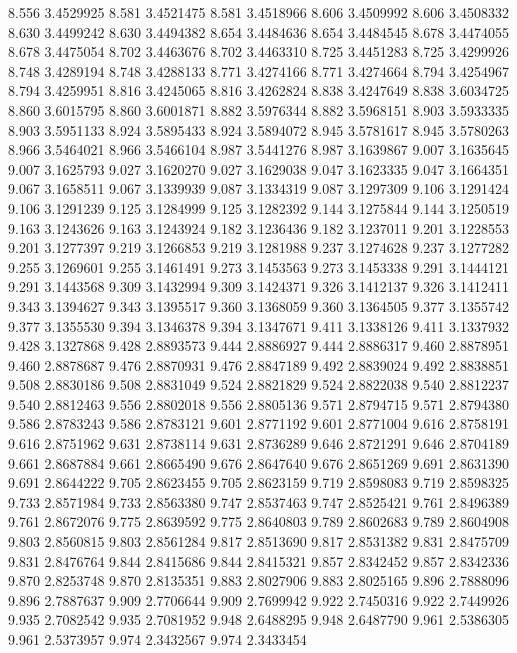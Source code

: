 8.556 3.4529925
8.581 3.4521475
8.581 3.4518966
8.606 3.4509992
8.606 3.4508332
8.630 3.4499242
8.630 3.4494382
8.654 3.4484636
8.654 3.4484545
8.678 3.4474055
8.678 3.4475054
8.702 3.4463676
8.702 3.4463310
8.725 3.4451283
8.725 3.4299926
8.748 3.4289194
8.748 3.4288133
8.771 3.4274166
8.771 3.4274664
8.794 3.4254967
8.794 3.4259951
8.816 3.4245065
8.816 3.4262824
8.838 3.4247649
8.838 3.6034725
8.860 3.6015795
8.860 3.6001871
8.882 3.5976344
8.882 3.5968151
8.903 3.5933335
8.903 3.5951133
8.924 3.5895433
8.924 3.5894072
8.945 3.5781617
8.945 3.5780263
8.966 3.5464021
8.966 3.5466104
8.987 3.5441276
8.987 3.1639867
9.007 3.1635645
9.007 3.1625793
9.027 3.1620270
9.027 3.1629038
9.047 3.1623335
9.047 3.1664351
9.067 3.1658511
9.067 3.1339939
9.087 3.1334319
9.087 3.1297309
9.106 3.1291424
9.106 3.1291239
9.125 3.1284999
9.125 3.1282392
9.144 3.1275844
9.144 3.1250519
9.163 3.1243626
9.163 3.1243924
9.182 3.1236436
9.182 3.1237011
9.201 3.1228553
9.201 3.1277397
9.219 3.1266853
9.219 3.1281988
9.237 3.1274628
9.237 3.1277282
9.255 3.1269601
9.255 3.1461491
9.273 3.1453563
9.273 3.1453338
9.291 3.1444121
9.291 3.1443568
9.309 3.1432994
9.309 3.1424371
9.326 3.1412137
9.326 3.1412411
9.343 3.1394627
9.343 3.1395517
9.360 3.1368059
9.360 3.1364505
9.377 3.1355742
9.377 3.1355530
9.394 3.1346378
9.394 3.1347671
9.411 3.1338126
9.411 3.1337932
9.428 3.1327868
9.428 2.8893573
9.444 2.8886927
9.444 2.8886317
9.460 2.8878951
9.460 2.8878687
9.476 2.8870931
9.476 2.8847189
9.492 2.8839024
9.492 2.8838851
9.508 2.8830186
9.508 2.8831049
9.524 2.8821829
9.524 2.8822038
9.540 2.8812237
9.540 2.8812463
9.556 2.8802018
9.556 2.8805136
9.571 2.8794715
9.571 2.8794380
9.586 2.8783243
9.586 2.8783121
9.601 2.8771192
9.601 2.8771004
9.616 2.8758191
9.616 2.8751962
9.631 2.8738114
9.631 2.8736289
9.646 2.8721291
9.646 2.8704189
9.661 2.8687884
9.661 2.8665490
9.676 2.8647640
9.676 2.8651269
9.691 2.8631390
9.691 2.8644222
9.705 2.8623455
9.705 2.8623159
9.719 2.8598083
9.719 2.8598325
9.733 2.8571984
9.733 2.8563380
9.747 2.8537463
9.747 2.8525421
9.761 2.8496389
9.761 2.8672076
9.775 2.8639592
9.775 2.8640803
9.789 2.8602683
9.789 2.8604908
9.803 2.8560815
9.803 2.8561284
9.817 2.8513690
9.817 2.8531382
9.831 2.8475709
9.831 2.8476764
9.844 2.8415686
9.844 2.8415321
9.857 2.8342452
9.857 2.8342336
9.870 2.8253748
9.870 2.8135351
9.883 2.8027906
9.883 2.8025165
9.896 2.7888096
9.896 2.7887637
9.909 2.7706644
9.909 2.7699942
9.922 2.7450316
9.922 2.7449926
9.935 2.7082542
9.935 2.7081952
9.948 2.6488295
9.948 2.6487790
9.961 2.5386305
9.961 2.5373957
9.974 2.3432567
9.974 2.3433454

